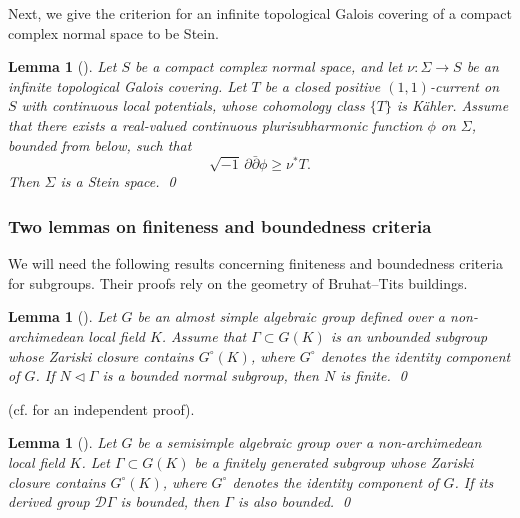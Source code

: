 \documentclass[english]{amsproc}
\theoremstyle{plain}
\newtheorem{lem}[thm]{Lemma}
\theoremstyle{definition}
\theoremstyle{remark}
\theoremstyle{plain}
\numberwithin{equation}{thm} %
\newcommand{\cD}{\mathcal D}
\begin{document}
Next, we give  the criterion for an infinite topological Galois covering of a compact complex normal space to be Stein.   
\begin{lem}[{\cite[Proposition 4.1.1]{Eys04}}]\label{prop:stein}
Let \(S\) be a compact complex normal space, and let \(\nu:\Sigma \to S\) be an infinite 
topological Galois covering.  
Let \(T\) be a closed positive \((1,1)\)-current on \(S\) with continuous local potentials, 
whose cohomology class \(\{T\}\) is K\"ahler. 
Assume that there exists a real-valued continuous plurisubharmonic function 
\(\phi\) on \(\Sigma\), bounded from below, such that
\[
\sqrt{-1}\,\partial\bar{\partial}\phi \ge \nu^{*}T .
\]
Then \(\Sigma\) is a Stein space.  \qed
\end{lem}
\subsubsection{Two lemmas on finiteness and boundedness criteria}
We will need the following results concerning finiteness and boundedness criteria for subgroups. 
Their proofs rely on the geometry of Bruhat--Tits buildings.
\begin{lem}[{\cite[Lemma 5.3]{CDY22}}]\label{lem:BT2}
	Let \(G\) be an almost simple algebraic group defined over a non-archimedean local field \(K\). 
	Assume that \(\Gamma \subset G(K)\) is an unbounded subgroup whose Zariski closure contains 
	\(G^{\circ}(K)\), where \(G^{\circ}\) denotes the identity component of \(G\). 
	If \(N \triangleleft \Gamma\) is a bounded normal subgroup, then \(N\) is finite.
	\qed
\end{lem}
 (cf. \cite{Bru22} for an independent proof).
\begin{lem}[{\cite[Lemma 7.15]{DY23b}}]\label{lem:BT}
	Let $G$ be a semisimple algebraic group over a  
	non-archimedean local field $K$.  Let $\Gamma\subset G(K)$ be a finitely generated subgroup   whose Zariski closure contains 
	\(G^{\circ}(K)\), where \(G^{\circ}\) denotes the identity component of \(G\). 
	If  its derived group $\cD \Gamma$ is  \emph{bounded}, then  $\Gamma$ is also  bounded. \qed
\end{lem} 
\end{document}
